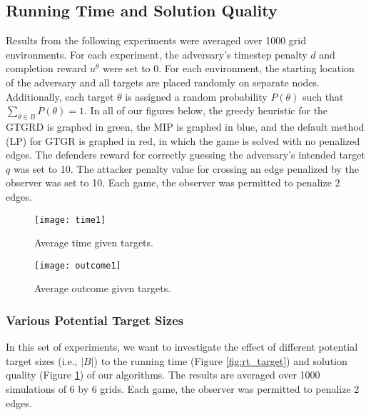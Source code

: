 \subsection{Running Time and Solution Quality}
Results from the following experiments were averaged over 1000 grid environments. 
For each experiment, the adversary's timestep penalty $d$ and completion reward $u^{\theta}$ were set to 0. 
For each environment, the starting location of the adversary and all targets are placed 
randomly on separate nodes. 
Additionally, each target $\theta$ is assigned a random probability $P(\theta)$ such 
that $\sum_{\theta \in B} P(\theta) = 1$. 
In all of our figures below, the greedy heuristic for the GTGRD is graphed in green, 
the MIP is graphed in blue, 
and the default method (LP) for GTGR is graphed in red, 
in which the game is solved with no penalized edges.
The defenders reward for correctly guessing the adversary's intended target $q$ was set to 10. 
The attacker penalty value for crossing an edge penalized by the observer was set to 10. 
Each game, the observer was permitted to penalize 2 edges.

\begin{figure}[!ht]
\begin{center}
\begin{minipage}{0.48\linewidth}
\texttt{[image: time1]}
\caption{Average time given targets.}
\label{fig:rt_target}
\end{minipage}%
\hfill
\begin{minipage}{0.49\linewidth}
\texttt{[image: outcome1]}
\caption{Average outcome given targets.}
\label{fig:sol_target}
\end{minipage}
\end{center}
\end{figure}

\subsubsection{Various Potential Target Sizes}
In this set of experiments, we want to investigate 
the effect of different potential target sizes (i.e., $|B|$) 
to the running time (Figure \ref{fig:rt_target}) 
and solution quality (Figure \ref{fig:sol_target}) of our algorithms. 
The results are averaged over 1000 simulations of 6 by 6 grids. 
Each game, the observer was permitted to penalize 2 edges. 

